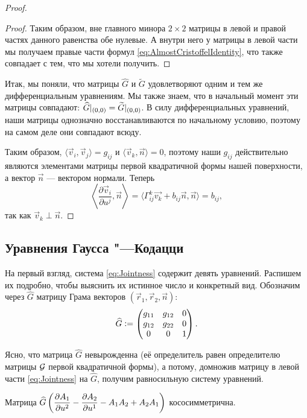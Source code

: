 \begin{proof}
\begin{proof}
		Таким образом, вне главного минора $2 \times 2$ матрицы в левой и правой частях данного равенства обе нулевые. А внутри него у матрицы в левой части мы получаем правые части формул \eqref{eq:AlmostCristoffelIdentity}, что также совпадает с тем, что мы хотели получить.
	\end{proof}

	Итак, мы поняли, что матрицы $\widehat{G}$ и $\widetilde{G}$ удовлетворяют одним и тем же дифференциальным уравнениям. Мы также знаем, что в начальный момент эти матрицы совпадают: $\widehat{G}|_{(0, 0)} \hm= \widetilde{G}|_{(0, 0)}$. В силу дифференциальных уравнений, наши матрицы однозначно восстанавливаются по начальному условию, поэтому на самом деле они совпадают всюду.

	Таким образом, $\langle\vec{v}_i, \vec{v}_j\rangle = g_{ij}$ и $\langle\vec{v}_k, \vec{n}\rangle = 0$, поэтому наши $g_{ij}$ действительно являются элементами матрицы первой квадратичной формы нашей поверхности, а вектор $\vec{n}$ --- вектором нормали. Теперь
	\[
		\left\langle\frac{\partial\vec{v}_i}{\partial u^j}, \vec{n}\right\rangle = \langle\Gamma_{ij}^k\vec{v_k} + b_{ij}\vec{n}, \vec{n}\rangle = b_{ij},
	\]
	так как $\vec{v}_k \perp \vec{n}$.
\end{proof}

\subsection{Уравнения Гаусса "---Кодацци}

На первый взгляд, система \eqref{eq:Jointness} содержит девять уравнений. Распишем их подробно, чтобы выяснить их истинное число и конкретный вид. Обозначим через $\widehat{G}$ матрицу Грама векторов $(\vec{r}_1, \vec{r}_2, \vec{n})$:
\[
	\widehat{G} \vcentcolon =
	\begin{pmatrix}
		g_{11} & g_{12} & 0\\
		g_{12} & g_{22} & 0\\
		0 & 0 & 1
	\end{pmatrix}.
\]

Ясно, что матрица $\widehat{G}$ невырожденна (её определитель равен определителю матрицы $\mathcal{G}$ первой квадратичной формы), а потому, домножив матрицу в левой части \eqref{eq:Jointness} на $\widehat{G}$, получим равносильную систему уравнений.

\begin{lemma}
	Матрица $\displaystyle\widehat{G}\left(\frac{\partial A_1}{\partial u^2} - \frac{\partial A_2}{\partial u^1} - A_1A_2 + A_2A_1\right)$ кососимметрична.
\end{lemma}


